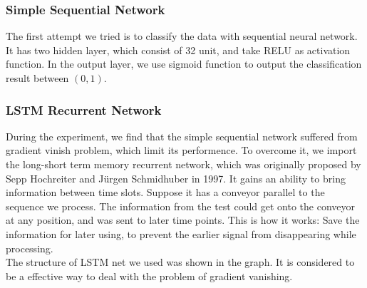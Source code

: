 \documentclass{article}
\begin{document}
\subsubsection{Simple Sequential Network}
The first attempt we tried is to classify the data with sequential neural network. It has two hidden layer, which consist of 32 unit, and take RELU as activation function. In the output layer, we use sigmoid function to output the classification result between $(0,1)$.
\subsubsection{LSTM Recurrent Network}
During the experiment, we find that the simple sequential network suffered from gradient vinish problem, which limit its performence. To overcome it, we import the long-short term memory recurrent network, which was originally proposed by Sepp Hochreiter and Jürgen Schmidhuber in 1997. It gains an ability to bring information between time slots. Suppose it has a conveyor parallel to the sequence we process. The information from the test could get onto the conveyor at any position, and was sent to later time points. This is how it works: Save the information for later using, to prevent the earlier signal from disappearing while processing.\\
The structure of LSTM net we used was shown in the graph. It is considered to be a effective way to deal with the problem of gradient vanishing.
\end{document}
